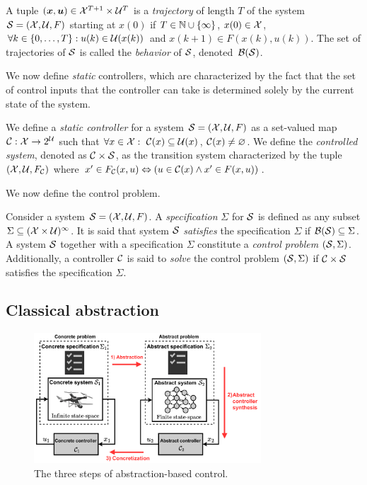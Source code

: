 \documentclass{juliacon}
\begin{document}
\vskip 6pt
A tuple $(\boldsymbol{x}, \boldsymbol{u})\in \mathcal{X}^{T+1}\times \mathcal{U}^{T}$ is a \emph{trajectory} of length $T$ of the system $\mathcal{S}=(\mathcal{X},\mathcal{U}, F)$ starting at $x(0)$ if $T\in\mathbb{N}\cup \{\infty\}$, $x(0)\in\mathcal{X}$, $\forall k\in \{0,\ldots,T\}: u(k)\in \mathcal{U}(x(k))$ and $x(k+1) \in F(x(k), u(k))$.
The set of trajectories of $\mathcal{S}$ is called the \emph{behavior} of $\mathcal{S}$, denoted~$\mathcal{B}(\mathcal{S})$.

\vskip 6pt 

We now define \emph{static} controllers, which are characterized by the fact that the set of control inputs that the controller can take is determined solely by the current state of the system.

\begin{defi}\label{def:controller}
 We define a \emph{static controller} for a system $\mathcal{S} = (\mathcal{X},\mathcal{U}, F)$ as a set-valued map $\mathcal{C} :\mathcal{X}\rightarrow 2^{\mathcal{U}}$ such that $\forall x\in\mathcal{X}: \ \mathcal{C}(x) \subseteq \mathcal{U}(x)$, $\mathcal{C}(x) \ne \varnothing$. We define the \emph{controlled system}, denoted as $\mathcal{C}\times \mathcal{S}$, as the transition system characterized by the tuple $(\mathcal{X},\mathcal{U}, F_{\mathcal{C}})$ where
 $x'\in F_{\mathcal{C}}(x, u) \Leftrightarrow (u\in \mathcal{C}(x)\land x'\in F(x,u))$.
\end{defi}

%
We now define the control problem.
\begin{defi}\label{def:specification}
Consider a system $\mathcal{S} = (\mathcal{X},\mathcal{U}, F)$. A \emph{specification} $\Sigma$ for $\mathcal{S}$ is defined as any subset $\Sigma \subseteq (\mathcal{X}\times \mathcal{U})^{\infty}$. It is said that system $\mathcal{S}$ \emph{satisfies} the specification $\Sigma$ if $\mathcal{B}(\mathcal{S})\subseteq \Sigma$. 
A system $\mathcal{S}$ together with a specification $\Sigma$ constitute a \emph{control problem} $(\mathcal{S},\Sigma)$.
Additionally, a controller $\mathcal{C}$ is said to \emph{solve} the control problem $(\mathcal{S},\Sigma)$ if $\mathcal{C}\times \mathcal{S}$ satisfies the specification $\Sigma$.
\end{defi}



\subsection{Classical abstraction}

\begin{figure}[t]
\centerline{\includegraphics[width=8.5cm]{Figures/Abstraction/Abstraction-based-control.pdf}}
\caption{The three steps of abstraction-based control.}
	\label{fig:abstraction-procedure}
\end{figure}
\end{document}
